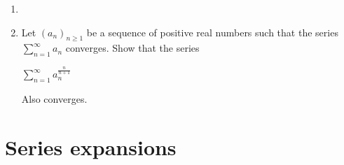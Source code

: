 \documentclass{article}
\theoremstyle{remark}
\begin{document}
\begin{enumerate}
    \item

    \item Let $(a_n)_{n\geq 1}$ be a sequence of positive real numbers such that
    the series $\sum_{n=1}^{\infty}a_n$ converges. Show that the series
    \begin{center}
        $\displaystyle \sum_{n=1}^{\infty}a_n^{\frac{n}{n+1}}$
    \end{center}
    Also converges.
\end{enumerate}
\section*{Series expansions}
\end{document}
